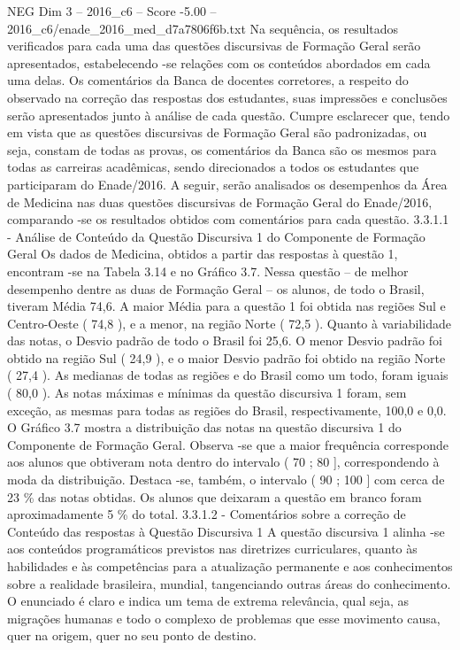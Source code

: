 \begin{textsample}{NEG Dim 3 – 2016\_c6 – Score -5.00 – 2016\_c6/enade\_2016\_med\_d7a7806f6b.txt}
Na sequência, os resultados verificados para cada uma das questões discursivas de Formação Geral serão apresentados, estabelecendo -se relações com os conteúdos abordados em cada uma delas.
Os comentários da Banca de docentes corretores, a respeito do observado na correção das respostas dos estudantes, suas impressões e conclusões serão apresentados junto à análise de cada questão.
Cumpre esclarecer que, tendo em vista que as questões discursivas de Formação Geral são padronizadas, ou seja, constam de todas as provas, os comentários da Banca são os mesmos para todas as carreiras acadêmicas, sendo direcionados a todos os estudantes que participaram do Enade/2016.
A seguir, serão analisados os desempenhos da Área de Medicina nas duas questões discursivas de Formação Geral do Enade/2016, comparando -se os resultados obtidos com comentários para cada questão. 3.3.1.1 - Análise de Conteúdo da Questão Discursiva 1 do Componente de Formação Geral Os dados de Medicina, obtidos a partir das respostas à questão 1, encontram -se na Tabela 3.14 e no Gráfico 3.7.
Nessa questão – de melhor desempenho dentre as duas de Formação Geral – os alunos, de todo o Brasil, tiveram Média 74,6.
A maior Média para a questão 1 foi obtida nas regiões Sul e Centro-Oeste ( 74,8 ), e a menor, na região Norte ( 72,5 ).
Quanto à variabilidade das notas, o Desvio padrão de todo o Brasil foi 25,6.
O menor Desvio padrão foi obtido na região Sul ( 24,9 ), e o maior Desvio padrão foi obtido na região Norte ( 27,4 ).
As medianas de todas as regiões e do Brasil como um todo, foram iguais ( 80,0 ).
As notas máximas e mínimas da questão discursiva 1 foram, sem exceção, as mesmas para todas as regiões do Brasil, respectivamente, 100,0 e 0,0.
O Gráfico 3.7 mostra a distribuição das notas na questão discursiva 1 do Componente de Formação Geral.
Observa -se que a maior frequência corresponde aos alunos que obtiveram nota dentro do intervalo ( 70 ; 80 ], correspondendo à moda da distribuição.
Destaca -se, também, o intervalo ( 90 ; 100 ] com cerca de 23 \% das notas obtidas.
Os alunos que deixaram a questão em branco foram aproximadamente 5 \% do total. 3.3.1.2 - Comentários sobre a correção de Conteúdo das respostas à Questão Discursiva 1 A questão discursiva 1 alinha -se aos conteúdos programáticos previstos nas diretrizes curriculares, quanto às habilidades e às competências para a atualização permanente e aos conhecimentos sobre a realidade brasileira, mundial, tangenciando outras áreas do conhecimento.
O enunciado é claro e indica um tema de extrema relevância, qual seja, as migrações humanas e todo o complexo de problemas que esse movimento causa, quer na origem, quer no seu ponto de destino.

\end{textsample}
